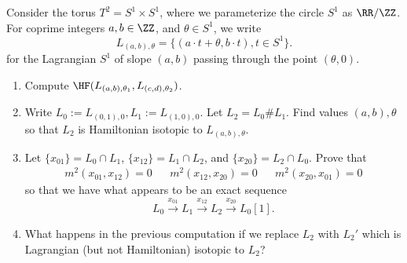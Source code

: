 
 
 
Consider the torus $T^2=S^1\times S^1$, where we parameterize the circle  $S^1$ as $\RR/\ZZ$. For coprime integers $a, b\in \ZZ$, and $\theta\in S^1$, we write 
\[L_{(a, b),\theta}=\{(a\cdot t+\theta,b\cdot t), t\in S^1\}.\]
for the Lagrangian $S^1$ of slope $(a, b)$ passing through the point $(\theta, 0)$. 
\begin{enumerate}
    \item Compute $\HF(L_{(a, b), \theta_1}, L_{(c, d), \theta_2})$.
    \item Write $L_0:=L_{(0,1), 0}, L_1:= L_{(1, 0), 0}$. Let $L_2 = L_0\# L_1$. Find values $(a, b), \theta$ so that $L_2$ is Hamiltonian isotopic to $L_{(a, b), \theta}$.
    \item Let $\{x_{01}\}=L_0\cap L_1$, $\{x_{12}\}=L_1\cap L_2$, and $\{x_{20}\}=L_2\cap L_0$. Prove that 
    \begin{align*}
        m^2(x_{01}, x_{12})=0 && m^2(x_{12}, x_{20})=0 && m^2(x_{20}, x_{01})=0
    \end{align*}
    so that we have what appears to be an exact sequence 
    \[L_0\xrightarrow{x_{01}} L_1 \xrightarrow{x_{12}} L_2 \xrightarrow{x_{20}} L_0[1].\]
    \item What happens in the previous computation if we replace $L_2$ with $L_2'$ which is Lagrangian (but not Hamiltonian) isotopic to $L_2$?
\end{enumerate}



 